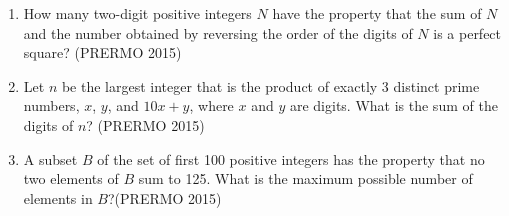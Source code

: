 \begin{enumerate}
\item How many two-digit positive integers $N$ have the property that the sum of $N$ and the number obtained by reversing the order of the digits of $N$ is a perfect square? \hfill(PRERMO 2015)

       \item Let $n$ be the largest integer that is the product of exactly 3 distinct prime numbers, $x$, $y$, and $10x + y$, where $x$ and $y$ are digits. What is the sum of the digits of $n$? \hfill(PRERMO 2015)

       \item A subset $B$ of the set of first 100 positive integers has the property that no two elements of $B$ sum to 125. What is the maximum possible number of elements in $B$?\hfill(PRERMO 2015)
       \end{enumerate}
